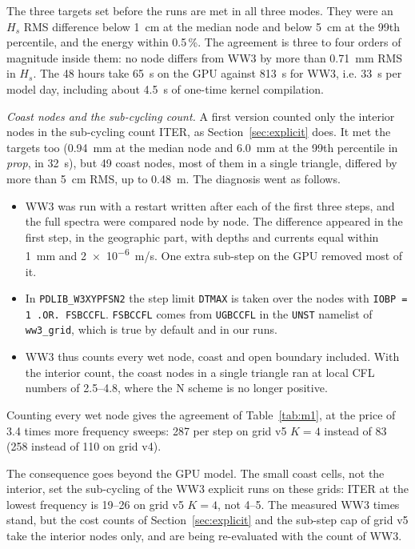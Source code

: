 \documentclass[11pt,a4paper]{article}
\begin{document}
The three targets set before the runs are met in all three modes. They
were an $H_s$ RMS difference below \SI{1}{cm} at the median node and below
\SI{5}{cm} at the 99th percentile, and the energy within 0.5\,\%. The
agreement is three to four orders of magnitude inside them: no node
differs from WW3 by more than \SI{0.71}{mm} RMS in $H_s$. The 48 hours
take \SI{65}{s} on the GPU against \SI{813}{s} for WW3, i.e. \SI{33}{s}
per model day, including about \SI{4.5}{s} of one-time kernel compilation.

\emph{Coast nodes and the sub-cycling count.} A first version counted only
the interior nodes in the sub-cycling count ITER, as
Section~\ref{sec:explicit} does. It met the targets too (\SI{0.94}{mm} at
the median node and \SI{6.0}{mm} at the 99th percentile in \emph{prop}, in
\SI{32}{s}), but 49 coast nodes, most of them in a single triangle,
differed by more than \SI{5}{cm} RMS, up to \SI{0.48}{m}. The diagnosis
went as follows.
\begin{itemize}
\item WW3 was run with a restart written after each of the first three
steps, and the full spectra were compared node by node. The difference
appeared in the first step, in the geographic part, with depths and
currents equal within \SI{1}{mm} and \SI{2e-6}{m/s}. One extra sub-step on
the GPU removed most of it.
\item In \texttt{PDLIB\_W3XYPFSN2} the step limit \texttt{DTMAX} is taken
over the nodes with \texttt{IOBP = 1 .OR. FSBCCFL}. \texttt{FSBCCFL} comes
from \texttt{UGBCCFL} in the \texttt{UNST} namelist of \texttt{ww3\_grid},
which is true by default and in our runs.
\item WW3 thus counts every wet node, coast and open boundary included.
With the interior count, the coast nodes in a single triangle ran at local
CFL numbers of 2.5--4.8, where the N scheme is no longer positive.
\end{itemize}
Counting every wet node gives the agreement of Table~\ref{tab:m1}, at the
price of 3.4 times more frequency sweeps: 287 per step on grid v5 $K=4$
instead of 83 (258 instead of 110 on grid v4).

The consequence goes beyond the GPU model. The small coast cells, not the
interior, set the sub-cycling of the WW3 explicit runs on these grids:
ITER at the lowest frequency is 19--26 on grid v5 $K=4$, not 4--5. The
measured WW3 times stand, but the cost counts of
Section~\ref{sec:explicit} and the sub-step cap of grid v5 take the
interior nodes only, and are being re-evaluated with the count of WW3.
\end{document}
